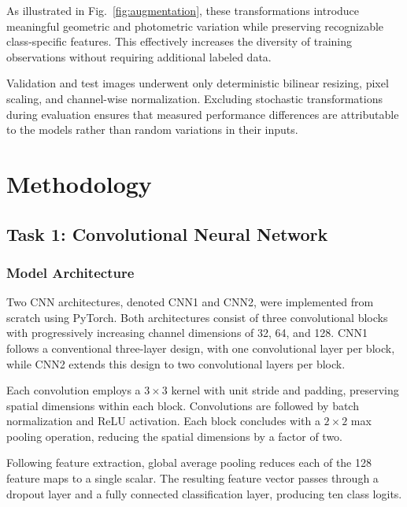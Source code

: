 \documentclass[conference]{IEEEtran}
\begin{document}
As illustrated in Fig.~\ref{fig:augmentation}, these
transformations introduce meaningful geometric and
photometric variation while preserving recognizable
class-specific features. This effectively increases the
diversity of training observations without requiring
additional labeled data.

Validation and test images underwent only deterministic
bilinear resizing, pixel scaling, and channel-wise
normalization. Excluding stochastic transformations
during evaluation ensures that measured performance
differences are attributable to the models rather than
random variations in their inputs.



\section{Methodology}
\label{sec:methodology}

\subsection{Task 1: Convolutional Neural Network}
\label{sec:cnn}

\subsubsection{Model Architecture}

Two CNN architectures, denoted CNN1 and CNN2, were
implemented from scratch using PyTorch. Both architectures
consist of three convolutional blocks with progressively
increasing channel dimensions of 32, 64, and 128.
CNN1 follows a conventional three-layer design, with one
convolutional layer per block, while CNN2 extends this
design to two convolutional layers per block.

Each convolution employs a $3 \times 3$ kernel with
unit stride and padding, preserving spatial dimensions
within each block. Convolutions are followed by batch
normalization and ReLU activation. Each block concludes
with a $2 \times 2$ max pooling operation, reducing the
spatial dimensions by a factor of two.

Following feature extraction, global average pooling
reduces each of the 128 feature maps to a single scalar.
The resulting feature vector passes through a dropout
layer and a fully connected classification layer,
producing ten class logits.
\end{document}
